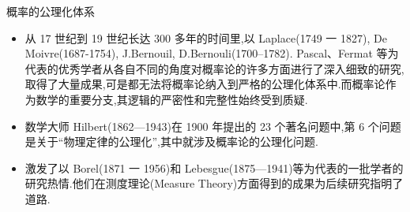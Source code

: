 \documentclass[Prob-All.tex]{subfiles}
\begin{document}
\begin{frame}{概率的公理化体系}

\begin{itemize}[<+-|alert@+>]
    \item  从 17 世纪到 19 世纪长达 300 多年的时间里,以 Laplace(1749 一
1827), De Moivre(1687-1754), J.Bernouil, D.Bernouli(1700--1782).
Pascal、Fermat 等为代表的优秀学者从各自不同的角度对概率论的许多方面进行了深入细致的研究,取得了大量成果,可是都无法将概率论纳入到严格的公理化体系中.而概率论作为数学的重要分支,其逻辑的严密性和完整性始终受到质疑.
\item 数学大师 Hilbert(1862—1943)在 1900 年提出的 23 个著名问题中,第 6 个问题是关于“物理定律的公理化”,其中就涉及概率论的公理化问题.
\item 激发了以 Borel(1871 一 1956)和 Lebesgue(1875—1941)等为代表的一批学者的研究热情.他们在测度理论(Measure Theory)方面得到的成果为后续研究指明了道路.
\end{itemize}
\end{frame}
\end{document}
